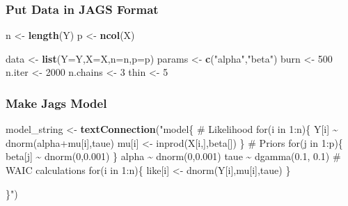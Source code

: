 \documentclass[
]{article}
\newenvironment{Shaded}{\begin{snugshade}}{\end{snugshade}}
\newcommand{\AttributeTok}[1]{\textcolor[rgb]{0.13,0.29,0.53}{#1}}
\newcommand{\DecValTok}[1]{\textcolor[rgb]{0.00,0.00,0.81}{#1}}
\newcommand{\FunctionTok}[1]{\textcolor[rgb]{0.13,0.29,0.53}{\textbf{#1}}}
\newcommand{\NormalTok}[1]{#1}
\newcommand{\OtherTok}[1]{\textcolor[rgb]{0.56,0.35,0.01}{#1}}
\newcommand{\StringTok}[1]{\textcolor[rgb]{0.31,0.60,0.02}{#1}}
\begin{document}
\subsubsection{Put Data in JAGS Format}\label{put-data-in-jags-format-1}

\begin{Shaded}
\begin{Highlighting}[]
\NormalTok{n }\OtherTok{\textless{}{-}} \FunctionTok{length}\NormalTok{(Y)}
\NormalTok{p }\OtherTok{\textless{}{-}} \FunctionTok{ncol}\NormalTok{(X)}

\NormalTok{data }\OtherTok{\textless{}{-}} \FunctionTok{list}\NormalTok{(}\AttributeTok{Y=}\NormalTok{Y,}\AttributeTok{X=}\NormalTok{X,}\AttributeTok{n=}\NormalTok{n,}\AttributeTok{p=}\NormalTok{p)}
\NormalTok{params }\OtherTok{\textless{}{-}} \FunctionTok{c}\NormalTok{(}\StringTok{"alpha"}\NormalTok{,}\StringTok{"beta"}\NormalTok{)}
\NormalTok{burn }\OtherTok{\textless{}{-}} \DecValTok{500}
\NormalTok{n.iter }\OtherTok{\textless{}{-}} \DecValTok{2000}
\NormalTok{n.chains }\OtherTok{\textless{}{-}} \DecValTok{3}
\NormalTok{thin }\OtherTok{\textless{}{-}} \DecValTok{5}
\end{Highlighting}
\end{Shaded}

\subsubsection{Make Jags Model}\label{make-jags-model-1}

\begin{Shaded}
\begin{Highlighting}[]
\NormalTok{model\_string }\OtherTok{\textless{}{-}} \FunctionTok{textConnection}\NormalTok{(}\StringTok{"model\{}
\StringTok{  \# Likelihood}
\StringTok{  for(i in 1:n)\{}
\StringTok{    Y[i] \textasciitilde{} dnorm(alpha+mu[i],taue)}
\StringTok{    mu[i] \textless{}{-} inprod(X[i,],beta[])}
\StringTok{  \}}
\StringTok{  }
\StringTok{  \# Priors}
\StringTok{  for(j in 1:p)\{}
\StringTok{    beta[j] \textasciitilde{} dnorm(0,0.001)}
\StringTok{  \}}
\StringTok{  }
\StringTok{  alpha \textasciitilde{} dnorm(0,0.001)}
\StringTok{  taue \textasciitilde{} dgamma(0.1, 0.1)}
\StringTok{  }
\StringTok{  \# WAIC calculations}
\StringTok{  for(i in 1:n)\{}
\StringTok{    like[i] \textless{}{-} dnorm(Y[i],mu[i],taue)}
\StringTok{  \}}

\StringTok{\}"}\NormalTok{)}
\end{Highlighting}
\end{Shaded}
\end{document}
